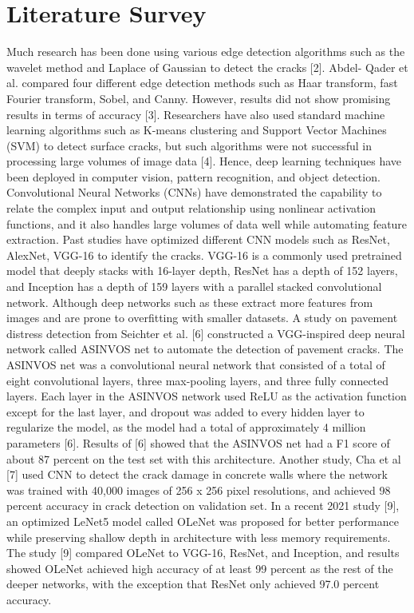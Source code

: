 \documentclass[conference]{IEEEtran}
\begin{document}
\section{Literature Survey}
Much research has been done using various edge detection algorithms such as the wavelet method and Laplace of Gaussian to detect the cracks [2]. Abdel- Qader et al. compared four different edge detection methods such as Haar transform, fast Fourier transform, Sobel, and Canny. However, results did not show promising results in terms of accuracy [3]. Researchers have also used standard machine learning algorithms such as K-means clustering and Support Vector Machines (SVM) to detect surface cracks, but such algorithms were not successful in processing large volumes of image data [4]. Hence, deep learning techniques have been deployed in computer vision, pattern recognition, and object detection. Convolutional Neural Networks (CNNs) have demonstrated the capability to relate the complex input and output relationship using nonlinear activation functions, and it also handles large volumes of data well while automating feature extraction. Past studies have optimized different CNN models such as ResNet, AlexNet, VGG-16 to identify the cracks. VGG-16 is a commonly used pretrained model that deeply stacks with 16-layer depth, ResNet has a depth of 152 layers, and Inception has a depth of 159 layers with a parallel stacked convolutional network. Although deep networks such as these extract more features from images and are prone to overfitting with smaller datasets. A study on pavement distress detection from Seichter et al. [6] constructed a VGG-inspired deep neural network called ASINVOS net to automate the detection of pavement cracks. The ASINVOS net was a convolutional neural network that consisted of a total of eight convolutional layers, three max-pooling layers, and three fully connected layers. Each layer in the ASINVOS network used ReLU as the activation function except for the last layer, and dropout was added to every hidden layer to regularize the model, as the model had a total of approximately 4 million parameters [6]. Results of [6] showed that the ASINVOS net had a F1 score of about 87 percent on the test set with this architecture. Another study, Cha et al [7] used CNN to detect the crack damage in concrete walls where the network was trained with 40,000 images of 256 x 256 pixel resolutions, and achieved 98 percent accuracy in crack detection on validation set. In a recent 2021 study [9], an optimized LeNet5 model called OLeNet was proposed for better performance while preserving shallow depth in architecture with less memory requirements. The study [9] compared OLeNet to VGG-16, ResNet, and Inception, and results showed OLeNet achieved high accuracy of at least 99 percent as the rest of the deeper networks, with the exception that ResNet only achieved 97.0 percent accuracy. 
\end{document}

